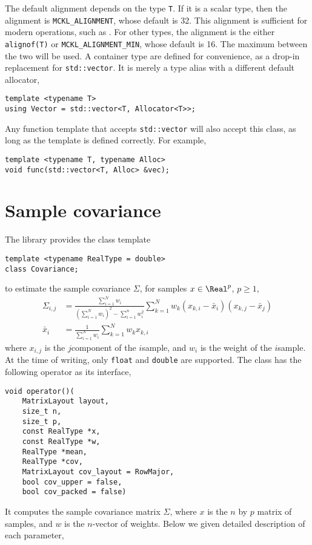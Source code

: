 The default alignment depends on the type \verb|T|. If it is a scalar type,
then the alignment is \verb|MCKL_ALIGNMENT|, whose default is 32. This
alignment is sufficient for modern \simd operations, such as \avx. For other
types, the alignment is the either \verb|alignof(T)| or
\verb|MCKL_ALIGNMENT_MIN|, whose default is 16. The maximum between the two
will be used. A container type are defined for convenience, as a drop-in
replacement for \verb|std::vector|. It is merely a type alias with a different
default allocator,
\begin{Verbatim}
template <typename T>
using Vector = std::vector<T, Allocator<T>>;
\end{Verbatim}
Any function template that accepts \verb|std::vector| will also accept this
class, as long as the template is defined correctly. For example,
\begin{Verbatim}
template <typename T, typename Alloc>
void func(std::vector<T, Alloc> &vec);
\end{Verbatim}

\section{Sample covariance}
\label{sec:Sample covariance}

The library provides the class template
\begin{Verbatim}
template <typename RealType = double>
class Covariance;
\end{Verbatim}
to estimate the sample covariance $\Sigma$, for samples $x\in\Real^p$, $p\ge1$,
\begin{align*}
  \Sigma_{i,j} &= \frac{\sum_{i=1}^N w_i}
  {(\sum_{i=1}^N w_i)^2 - \sum_{i=1}^n w_i^2}
  \sum_{k=1}^N w_k (x_{k,i} - \bar{x}_i)(x_{k,j} - \bar{x}_j) \\
  \bar{x}_i &= \frac{1}{\sum_{i=1}^N w_i}\sum_{k=1}^N w_k x_{k,i}
\end{align*}
where $x_{i,j}$ is the $j$\ith component of the $i$\ith sample, and $w_i$ is
the weight of the $i$\ith sample. At the time of writing, only \verb|float| and
\verb|double| are supported. The class has the following operator as its
interface,
\begin{Verbatim}
void operator()(
    MatrixLayout layout,
    size_t n,
    size_t p,
    const RealType *x,
    const RealType *w,
    RealType *mean,
    RealType *cov,
    MatrixLayout cov_layout = RowMajor,
    bool cov_upper = false,
    bool cov_packed = false)
\end{Verbatim}
It computes the sample covariance matrix $\Sigma$,
where $x$ is the $n$ by $p$ matrix of samples, and $w$ is the $n$-vector of
weights. Below we given detailed description of each parameter,

